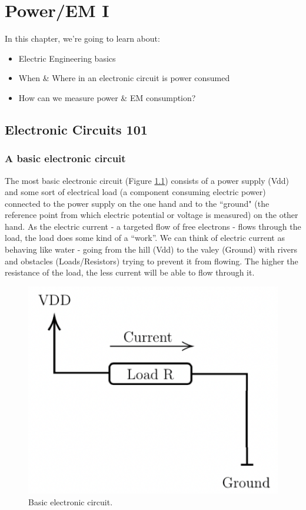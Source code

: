 \chapter{Power/EM I} \label{c4_forthchapter:cha}

In this chapter, we're going to learn about:
\begin{itemize}
    \item Electric Engineering basics
    \item When \& Where in an electronic circuit is power consumed
    \item How can we measure power \& EM consumption?
\end{itemize}

\section{Electronic Circuits 101}

\subsection{A basic electronic circuit}

The most basic electronic circuit (Figure \ref{fig:basic_electronic_circuitn}) consists of a power supply (Vdd)
and some sort of electrical load (a component consuming electric power)
connected to the power supply on the one hand and to the ``ground" (the reference point from which electric potential or voltage is measured) on the other hand. As the electric current - a targeted flow of free electrons -
flows through the load, the load does some kind of a ``work''. We can think of electric
current as behaving like water - going from the hill (Vdd) to the valey (Ground) with rivers and obstacles (Loads/Resistors) trying to prevent it from flowing. The higher the resistance of the load, the less current will be able to flow through it.

\begin{figure}[!ht]
	\centering
	\includegraphics{images/basic_electronic_circuit.png}
	\caption{Basic electronic circuit.} \label{fig:basic_electronic_circuitn}
\end{figure}


